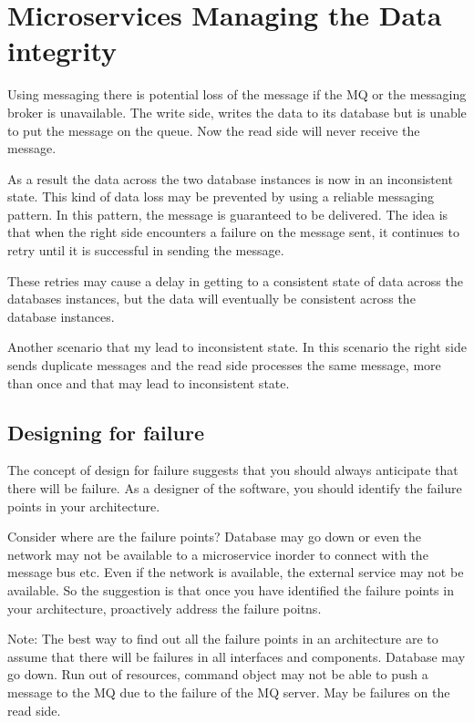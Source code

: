 \chapter{Microservices Managing the Data integrity}
Using messaging there is potential loss of the message if the MQ or the messaging broker is unavailable.
The write side, writes the data to its database but is unable to put the message on the queue.
Now the read side will never receive the message.

As a result the data across the two database instances is now in an inconsistent state.
This kind of data loss may be prevented by using a reliable messaging pattern.
In this pattern, the message is guaranteed to be delivered.
The idea is that when the right side encounters a failure on the message sent, it continues to retry until it is successful in sending the message.

These retries may cause a delay in getting to a consistent state of data across the databases instances, but the data will eventually be consistent across the database instances.

Another scenario that my lead to inconsistent state.
In this scenario the right side sends duplicate messages and the read side processes the same message, more than once and that may lead to inconsistent state.

\section{Designing for failure}
The concept of design for failure suggests that you should always anticipate that there will be failure.
As a designer of the software, you should identify the failure points in your architecture.

Consider where are the failure points?
Database may go down or even the network may not be available to a microservice inorder to connect with the message bus etc.
Even if the network is available, the external service may not be available.
So the suggestion is that once you have identified the failure points in your architecture, proactively address the failure poitns.

Note:
The best way to find out all the failure points in an architecture are to assume that there will be failures in all interfaces and components.
Database may go down.
Run out of resources, command object may not be able to push a message to the MQ due to the failure of the MQ server.
May be failures on the read side.

